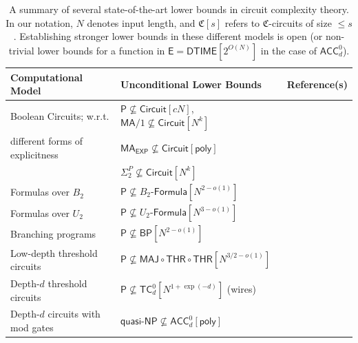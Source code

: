 \documentclass[11pt]{article}
\numberwithin{equation}{section}
\theoremstyle{definition}
\theoremstyle{plain}
\begin{document}
\vspace{-0.2cm}

\begin{table}[h!]
  \renewcommand{\arraystretch}{1.3}
\begin{center}
  \begin{tabular}{| l | l | c |}
    \hline
    \textbf{Computational Model} & \textbf{Unconditional Lower Bounds} & \textbf{Reference(s)} \\ \hline  \vspace{-0.15cm}
    Boolean Circuits; w.r.t. & $\mathsf{P} \nsubseteq \mathsf{Circuit}[c  N]$, $\mathsf{MA}/1 \nsubseteq \mathsf{Circuit}[N^k]$ & \cite{DBLP:conf/mfcs/IwamaM02, DBLP:conf/focs/FindGHK16} \\ 
    different forms of explicitness & $\mathsf{MA}_\mathsf{EXP} \nsubseteq \mathsf{Circuit}[\mathsf{poly}]$ & \cite{DBLP:conf/coco/BuhrmanFT98, DBLP:journals/siamcomp/Santhanam09}\\ %
& $\Sigma^P_2\not\subseteq \mathsf{Circuit}[N^k]$ & \cite{DBLP:journals/iandc/Kannan82} \\ \hline 
    Formulas over $B_2$  & $\mathsf{P} \nsubseteq B_2$-$\mathsf{Formula}[N^{2 - o(1)}]$ & \cite{ne66}  \\  \hline
    Formulas over $U_2$  & $\mathsf{P} \nsubseteq U_2$-$\mathsf{Formula}[N^{3 - o(1)}]$ & \cite{DBLP:journals/siamcomp/Hastad98, DBLP:conf/focs/Tal14, DBLP:conf/coco/DinurM16} \\  \hline
    Branching programs & $\mathsf{P} \nsubseteq  \mathsf{BP}[N^{2 - o(1)}]$ & \cite{ne66} \\  \hline
    Low-depth threshold circuits & $\mathsf{P} \nsubseteq \mathsf{MAJ} \circ \mathsf{THR} \circ \mathsf{THR}[N^{3/2 - o(1)}]$ & \cite{DBLP:conf/stoc/KaneW16} \\  \hline
    Depth-$d$ threshold circuits & $\mathsf{P} \nsubseteq \mathsf{TC}^0_d[N^{1 + \exp(-d)}]$ (wires) & \cite{DBLP:journals/siamcomp/ImpagliazzoPS97} \\  \hline
    Depth-$d$ circuits with mod gates & $\mathsf{quasi}$-$\mathsf{NP} \nsubseteq \mathsf{ACC}^0_d[\mathsf{poly}]$ & \cite{DBLP:conf/stoc/MurrayW18} \\  \hline
  \end{tabular}
  \vspace{0.3cm}
  \caption{A summary of several state-of-the-art lower bounds in circuit complexity theory. In our notation, $N$ denotes input length, and $\mathfrak{C}[s]$ refers to $\mathfrak{C}$-circuits of size $\leq s$. Establishing stronger lower bounds in these different models is open (or non-trivial lower bounds for a function in $\mathsf{E} = \mathsf{DTIME}[2^{O(N)}]$ in the case of $\mathsf{ACC}^0_d$).}
\label{table:state-of-the-art}
\end{center}
\end{table}
\end{document}
